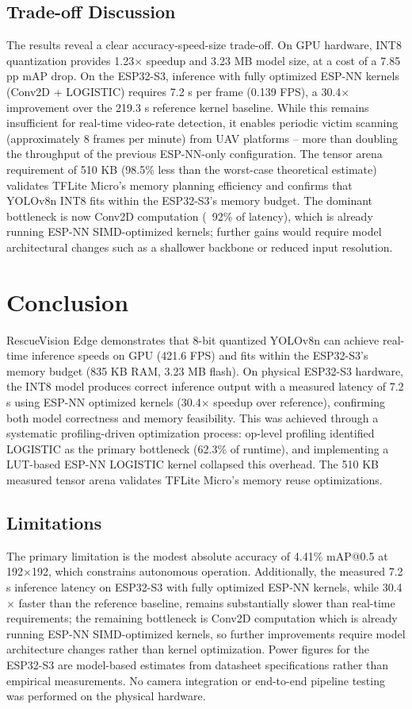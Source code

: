 \documentclass[10pt,twocolumn]{article}
\begin{document}
\subsection{Trade-off Discussion}
The results reveal a clear accuracy-speed-size trade-off. On GPU hardware, INT8 quantization provides 1.23$\times$ speedup and 3.23 MB model size, at a cost of a 7.85 pp mAP drop. On the ESP32-S3, inference with fully optimized ESP-NN kernels (Conv2D + LOGISTIC) requires 7.2 s per frame (0.139 FPS), a 30.4$\times$ improvement over the 219.3 s reference kernel baseline. While this remains insufficient for real-time video-rate detection, it enables periodic victim scanning (approximately 8 frames per minute) from UAV platforms -- more than doubling the throughput of the previous ESP-NN-only configuration. The tensor arena requirement of 510 KB (98.5\% less than the worst-case theoretical estimate) validates TFLite Micro's memory planning efficiency and confirms that YOLOv8n INT8 fits within the ESP32-S3's memory budget. The dominant bottleneck is now Conv2D computation (~92\% of latency), which is already running ESP-NN SIMD-optimized kernels; further gains would require model architectural changes such as a shallower backbone or reduced input resolution.

\section{Conclusion}
\label{sec:conclusion}

RescueVision Edge demonstrates that 8-bit quantized YOLOv8n can achieve real-time inference speeds on GPU (421.6 FPS) and fits within the ESP32-S3's memory budget (835 KB RAM, 3.23 MB flash). On physical ESP32-S3 hardware, the INT8 model produces correct inference output with a measured latency of 7.2 s using ESP-NN optimized kernels (30.4$\times$ speedup over reference), confirming both model correctness and memory feasibility. This was achieved through a systematic profiling-driven optimization process: op-level profiling identified LOGISTIC as the primary bottleneck (62.3\% of runtime), and implementing a LUT-based ESP-NN LOGISTIC kernel collapsed this overhead. The 510 KB measured tensor arena validates TFLite Micro's memory reuse optimizations.

\subsection{Limitations}
The primary limitation is the modest absolute accuracy of 4.41\% mAP@0.5 at 192$\times$192, which constrains autonomous operation. Additionally, the measured 7.2 s inference latency on ESP32-S3 with fully optimized ESP-NN kernels, while 30.4$\times$ faster than the reference baseline, remains substantially slower than real-time requirements; the remaining bottleneck is Conv2D computation which is already running ESP-NN SIMD-optimized kernels, so further improvements require model architecture changes rather than kernel optimization. Power figures for the ESP32-S3 are model-based estimates from datasheet specifications rather than empirical measurements. No camera integration or end-to-end pipeline testing was performed on the physical hardware.
\end{document}
